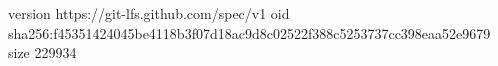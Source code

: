 version https://git-lfs.github.com/spec/v1
oid sha256:f45351424045be4118b3f07d18ac9d8c02522f388c5253737cc398eaa52e9679
size 229934
